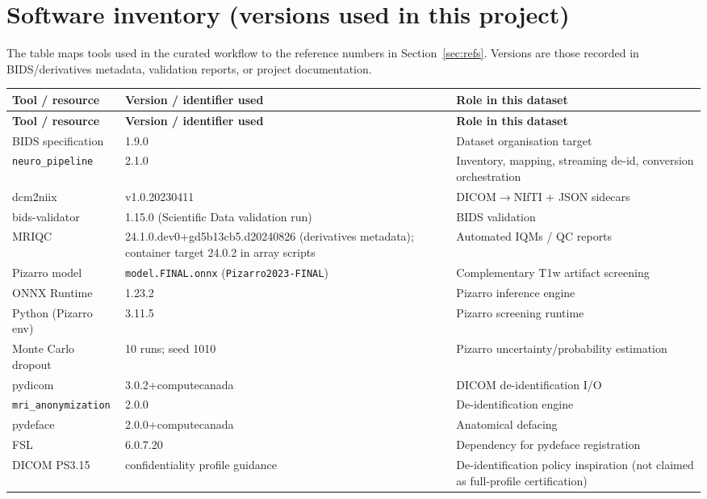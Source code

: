 \documentclass[11pt,letterpaper]{article}
\begin{document}
\newpage

\section{Software inventory (versions used in this project)}

The table maps tools used in the curated workflow to the reference numbers in
Section~\ref{sec:refs}. Versions are those recorded in BIDS/derivatives metadata,
validation reports, or project documentation.

\begin{center}
\small
\begin{longtable}{@{}llp{}@{}}
\toprule
\textbf{Tool / resource} & \textbf{Version / identifier used} & \textbf{Role in this dataset} \\
\midrule
\endfirsthead
\toprule
\textbf{Tool / resource} & \textbf{Version / identifier used} & \textbf{Role in this dataset} \\
\midrule
\endhead
\bottomrule
\endfoot
BIDS specification & 1.9.0 & Dataset organisation target \\
\texttt{neuro\_pipeline} & 2.1.0 & Inventory, mapping, streaming de-id, conversion orchestration \\
dcm2niix & v1.0.20230411 & DICOM$\rightarrow$NIfTI + JSON sidecars \\
bids-validator & 1.15.0 (Scientific Data validation run) & BIDS validation \\
MRIQC & 24.1.0.dev0+gd5b13cb5.d20240826 (derivatives metadata); container target 24.0.2 in array scripts & Automated IQMs / QC reports \\
Pizarro model & \texttt{model.FINAL.onnx} (\texttt{Pizarro2023-FINAL}) & Complementary T1w artifact screening \\
ONNX Runtime & 1.23.2 & Pizarro inference engine \\
Python (Pizarro env) & 3.11.5 & Pizarro screening runtime \\
Monte Carlo dropout & 10 runs; seed 1010 & Pizarro uncertainty/probability estimation \\
pydicom & 3.0.2+computecanada & DICOM de-identification I/O \\
\texttt{mri\_anonymization} & 2.0.0 & De-identification engine \\
pydeface & 2.0.0+computecanada & Anatomical defacing \\
FSL & 6.0.7.20 & Dependency for pydeface registration \\
DICOM PS3.15 & confidentiality profile guidance & De-identification policy inspiration (not claimed as full-profile certification) \\
\end{longtable}
\end{center}
\end{document}
